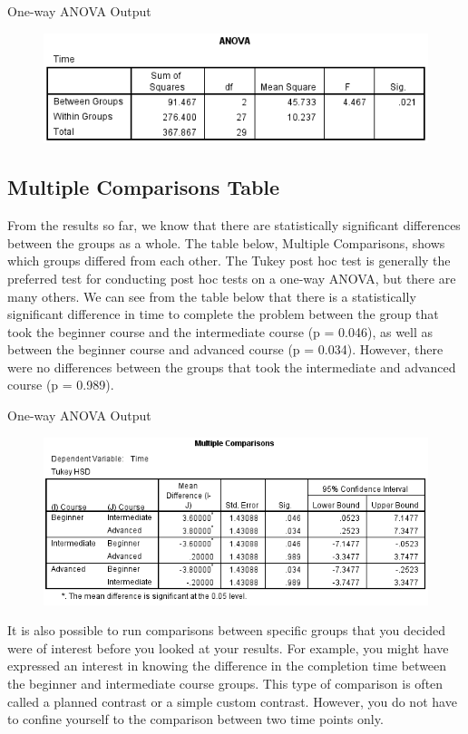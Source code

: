 \documentclass[]{article}
\begin{document}
One-way ANOVA Output
\begin{figure}[h!]
\centering
\includegraphics[width=0.7\linewidth]{images/one-way-anova-output-3}
\caption{}
\label{fig:one-way-anova-output-3}
\end{figure}

\subsection{Multiple Comparisons Table}
From the results so far, we know that there are statistically significant differences between the groups as a whole. The table below, Multiple Comparisons, shows which groups differed from each other. The Tukey post hoc test is generally the preferred test for conducting post hoc tests on a one-way ANOVA, but there are many others. We can see from the table below that there is a statistically significant difference in time to complete the problem between the group that took the beginner course and the intermediate course (p = 0.046), as well as between the beginner course and advanced course (p = 0.034). However, there were no differences between the groups that took the intermediate and advanced course (p = 0.989).

One-way ANOVA Output
\begin{figure}
\centering
\includegraphics[width=0.7\linewidth]{images/one-way-anova-output-5}
\caption{}
\label{fig:one-way-anova-output-5}
\end{figure}
It is also possible to run comparisons between specific groups that you decided were of interest before you looked at your results. For example, you might have expressed an interest in knowing the difference in the completion time between the beginner and intermediate course groups. This type of comparison is often called a planned contrast or a simple custom contrast. However, you do not have to confine yourself to the comparison between two time points only. 
\end{document}
